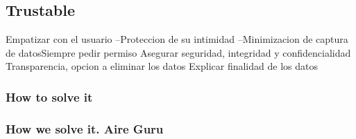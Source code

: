 \subsection{Trustable}
Empatizar con el usuario
--Proteccion de su intimidad
--Minimizacion de captura de datosSiempre pedir permiso
Asegurar seguridad, integridad y confidencialidad
Transparencia, opcion a eliminar los datos
Explicar finalidad de los datos\\

\subsubsection{How to solve it} 


\subsubsection{How we solve it. Aire Guru} 
 
\begin{itemize}
    \done
    \crossed
    
\end{itemize}
\newpage